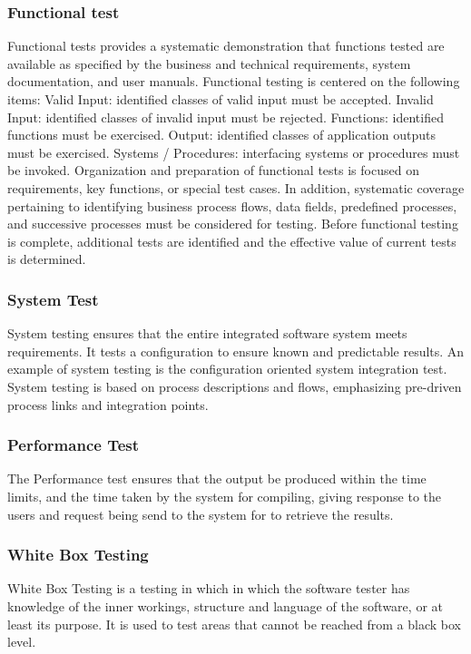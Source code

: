 \documentclass[12pt,a4paper]{report}
\begin{document}
\subsubsection{Functional test}
Functional tests provides a systematic demonstration that functions tested are
available as specified by the business and technical requirements, system
documentation, and user manuals. Functional testing is centered on the following
items:
Valid Input: identified classes of valid input must be accepted.
Invalid Input: identified classes of invalid input must be rejected.
Functions: identified functions must be exercised.
Output: identified classes of application outputs must be exercised.
Systems / Procedures: interfacing systems or procedures must be invoked.
Organization and preparation of functional tests is focused on requirements,
key functions, or special test cases. In addition, systematic coverage pertaining to
identifying business process flows, data fields, predefined processes, and successive
processes must be considered for testing. Before functional testing is complete,
additional tests are identified and the effective value of current tests is determined.
\subsubsection{System Test}
System testing ensures that the entire integrated software system meets
requirements. It tests a configuration to ensure known and predictable results. An
example of system testing is the configuration oriented system integration test.
System testing is based on process descriptions and flows, emphasizing pre-driven
process links and integration points.
\subsubsection{Performance Test}
The Performance test ensures that the output be produced within the time
limits, and the time taken by the system for compiling, giving response to the users
and request being send to the system for to retrieve the results.
\subsubsection{White Box Testing}
White Box Testing is a testing in which in which the software tester has
knowledge of the inner workings, structure and language of the software, or at least its
purpose. It is used to test areas that cannot be reached from a black box level.
\end{document}
